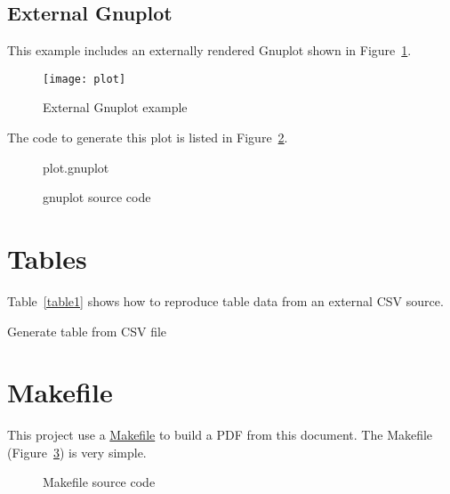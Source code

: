 \documentclass[10pt,a4paper]{article}
\begin{document}
\subsection*{External Gnuplot}
This example includes an externally rendered Gnuplot shown in
Figure~\ref{fig:external}.
\begin{figure}
  \centering
  \texttt{[image: plot]}
  \caption{External Gnuplot example}
  \label{fig:external}
\end{figure}
The code to generate this plot is listed in Figure~\ref{lst:external}.
\begin{figure}
  \begin{lstinputlisting}[language=Gnuplot]{plot.gnuplot}
  \end{lstinputlisting}
  \caption{gnuplot source code}
  \label{lst:external}
\end{figure}

\sectionbreak{}

\section*{Tables}
Table~\ref{table1} shows how to reproduce table data from an external CSV
source.
\begin{table}
  \begin{center}
    \caption{Generate table from CSV file}
    \label{table1}
  \end{center}
\end{table}

\lipsum[3]

\sectionbreak{}

\section*{Makefile}

This project use a \href{https://www.gnu.org/software/make/}{Makefile} to build
a PDF from this document. The Makefile (Figure~\ref{lst:Makefile}) is very
simple.
\begin{figure}
  
  \caption{Makefile source code}
  \label{lst:Makefile}
\end{figure}
\end{document}
